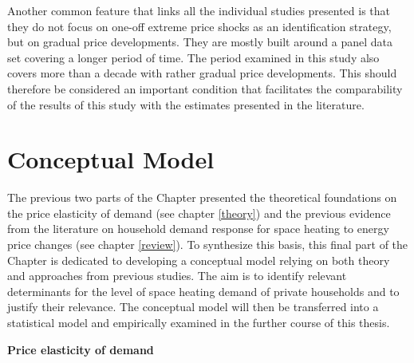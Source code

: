 \documentclass[12pt,twoside]{reedthesis}
\begin{document}
Another common feature that links all the individual studies presented is that they do not focus on one-off extreme price shocks as an identification strategy, but on gradual price developments. They are mostly built around a panel data set covering a longer period of time. The period examined in this study also covers more than a decade with rather gradual price developments. This should therefore be considered an important condition that facilitates the comparability of the results of this study with the estimates presented in the literature.

\hypertarget{conceptual-model}{%
\section{Conceptual Model}\label{conceptual-model}}

The previous two parts of the Chapter presented the theoretical foundations on the price elasticity of demand (see chapter \ref{theory}) and the previous evidence from the literature on household demand response for space heating to energy price changes (see chapter \ref{review}). To synthesize this basis, this final part of the Chapter is dedicated to developing a conceptual model relying on both theory and approaches from previous studies. The aim is to identify relevant determinants for the level of space heating demand of private households and to justify their relevance. The conceptual model will then be transferred into a statistical model and empirically examined in the further course of this thesis.

\textbf{Price elasticity of demand}
\end{document}
